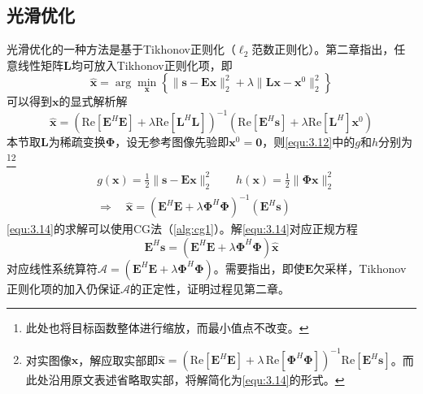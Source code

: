 \documentclass[12pt]{article}
\begin{document}
\subsection{光滑优化}\label{chap:3.1}
光滑优化的一种方法是基于Tikhonov正则化（$\ell_2$范数正则化）。第二章指出，任意线性矩阵$\mathbf{L}$均可放入Tikhonov正则化项，即
\begin{equation}
    \hat{\bm{x}}=\arg\min_{\bm{x}}\left\{\|\bm{s}-\mathbf{E}\bm{x}\|_2^2+\lambda\|\mathbf{L}\bm{x}-\bm{x}^0\|_2^2\right\}
\end{equation}
可以得到$\bm{x}$的显式解析解
\begin{equation}
    \hat{\bm{x}}=\left(\mathrm{Re}\left[\mathbf{E}^H\mathbf{E}\right]+\lambda\mathrm{Re}\left[\mathbf{L}^H\mathbf{L}\right]\right)^{-1}\left(\mathrm{Re}\left[\mathbf{E}^H\bm{s}\right]+\lambda\mathrm{Re}\left[\mathbf{L}^H\right]\bm{x}^0\right)
    \label{equ:3.13.0}
\end{equation}
本节取$\mathbf{L}$为稀疏变换$\bm{\Phi}$，设无参考图像先验即$\bm{x}^0=\bm{0}$，则\autoref{equ:3.12}中的$g$和$h$分别为\footnote{此处也将目标函数整体进行缩放，而最小值点不改变。}\footnote{对实图像$\bm{x}$，解应取实部即$\hat{\bm{x}}=\left(\mathrm{Re}\left[\mathbf{E}^H\mathbf{E}\right]+\lambda\,\mathrm{Re}\left[\bm{\Phi}^H\bm{\Phi}\right]\right)^{-1}\mathrm{Re}\left[\mathbf{E}^H\bm{s}\right]$。而此处沿用原文表述省略取实部，将解简化为\autoref{equ:3.14}的形式。}
\begin{align}
    &g(\bm{x})=\frac{1}{2}\|\bm{s}-\mathbf{E}\bm{x}\|_2^2\qquad h(\bm{x})=\frac{1}{2}\|\bm{\Phi}\bm{x}\|_2^2 \label{equ:3.13} \\
    &\Rightarrow\quad\boxed{\hat{\bm{x}}=(\mathbf{E}^H\mathbf{E}+\lambda\bm{\Phi}^H\bm{\Phi})^{-1}(\mathbf{E}^H\bm{s})}
    \label{equ:3.14}
\end{align}
\autoref{equ:3.14}的求解可以使用CG法（\autoref{alg:cg1}）。解\autoref{equ:3.14}对应正规方程
\begin{equation}
    \mathbf{E}^H\bm{s}=(\mathbf{E}^H\mathbf{E}+\lambda\bm{\Phi}^H\bm{\Phi})\hat{\bm{x}}
\end{equation}
对应线性系统算符$\mathcal{A}=(\mathbf{E}^H\mathbf{E}+\lambda\bm{\Phi}^H\bm{\Phi})$。需要指出，即使$\mathbf{E}$欠采样，Tikhonov正则化项的加入仍保证$\mathcal{A}$的正定性，证明过程见第二章。
\end{document}
